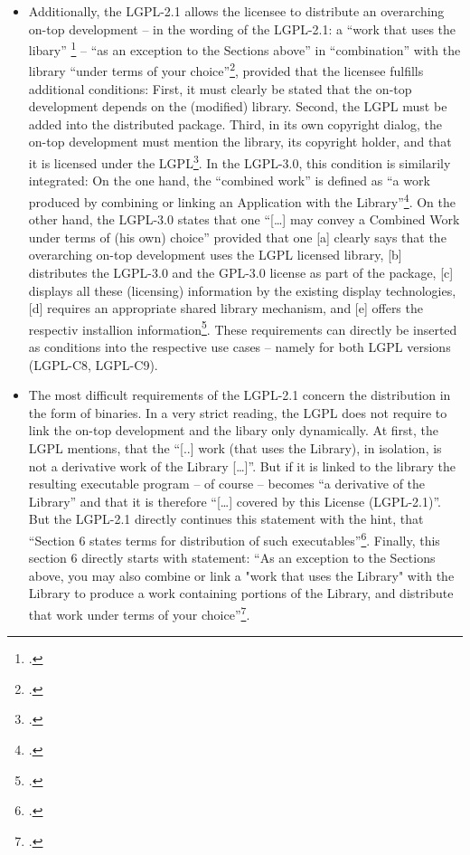 \begin{itemize}
  \item Additionally, the LGPL-2.1 allows the licensee to distribute an
  overarching on-top development -- in the wording of the LGPL-2.1: a
  \enquote{work that uses the libary} \footcite[cf.][\nopage wp.\ §5,
  §6]{Lgpl21OsiLicense1999a} -- \enquote{as an exception to the Sections above}
  in \enquote{combination} with the library \enquote{under terms of your
  choice}\footcite[cf.][\nopage wp.\ §6]{Lgpl21OsiLicense1999a}, provided that
  the licensee fulfills additional conditions:  First, it must clearly be stated
  that the on-top development depends on the (modified) library. Second, the
  LGPL must be added into the distributed package. Third, in its own copyright
  dialog, the on-top development must mention the library, its copyright holder,
  and that it is licensed under the LGPL\footcite[cf.][\nopage wp.\
  §6]{Lgpl21OsiLicense1999a}. In the LGPL-3.0, this condition is similarily
  integrated: On the one hand, the \enquote{combined work} is defined as
  \enquote{a work produced by combining or linking an Application with the
  Library}\footcite[cf.][\nopage wp.\ §0]{Lgpl30OsiLicense2007a}. On the other
  hand, the LGPL-3.0 states that one \enquote{[\ldots] may convey a Combined
  Work under terms of (his own) choice} provided that one [a] clearly says that
  the overarching on-top development uses the LGPL licensed library, [b]
  distributes the LGPL-3.0 and the GPL-3.0 license as part of the package, [c]
  displays all these (licensing) information by the existing display
  technologies, [d] requires an appropriate shared library mechanism, and [e]
  offers the respectiv installion information\footcite[cf.][\nopage wp.\
  §4]{Lgpl30OsiLicense2007a}. These requirements can directly be inserted as
  conditions into the respective use cases -- namely for both LGPL versions
  (LGPL-C8, LGPL-C9).
  
  \item The most difficult requirements of the LGPL-2.1 concern the distribution
  in the form of binaries. In a very strict reading, the LGPL does not require
  to link the on-top development and the libary only dynamically. At first, the
  LGPL mentions, that the \enquote{[..] work (that uses the Library), in
  isolation, is not a derivative work of the Library [\ldots]}. But if it is
  linked to the library the resulting executable program -- of course -- becomes
  \enquote{a derivative of the Library} and that it is therefore
  \enquote{[\ldots] covered by this License (LGPL-2.1)}. But the LGPL-2.1
  directly continues this statement with the hint, that \enquote{Section 6
  states terms for distribution of such executables}\footcite[cf.][\nopage wp.\
  §5]{Lgpl21OsiLicense1999a}. Finally, this section 6 directly starts with
  statement: \enquote{As an exception to the Sections above, you may also
  combine or link a "work that uses the Library" with the Library to produce a
  work containing portions of the Library, and distribute that work under terms
  of your choice}\footcite[cf.][\nopage wp.\ §6]{Lgpl21OsiLicense1999a}.
  

\end{itemize}
